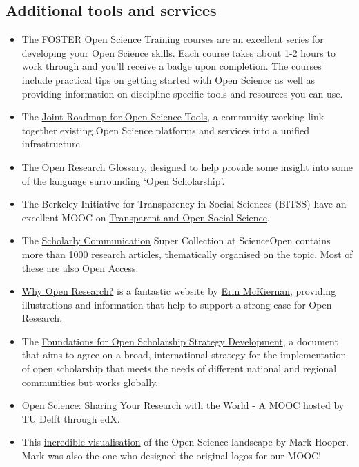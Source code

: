 \documentclass[]{book}
\begin{document}
{{{{{{\hypertarget{additional-tools-and-services}{%
\subsection{Additional tools and services}\label{additional-tools-and-services}}

\begin{itemize}
\item
  The \href{https://www.fosteropenscience.eu/toolkit}{FOSTER Open Science Training courses} are an excellent series for developing your Open Science skills. Each course takes about 1-2 hours to work through and you'll receive a badge upon completion. The courses include practical tips on getting started with Open Science as well as providing information on discipline specific tools and resources you can use.
\item
  The \href{http://jrost.org/}{Joint Roadmap for Open Science Tools}, a community working link together existing Open Science platforms and services into a unified infrastructure.
\item
  The \href{http://www.righttoresearch.org/resources/OpenResearchGlossary/index.shtml}{Open Research Glossary}, designed to help provide some insight into some of the language surrounding `Open Scholarship'.
\item
  The Berkeley Initiative for Transparency in Social Sciences (BITSS) have an excellent MOOC on \href{https://www.bitss.org/events/mooc-transparent-and-open-social-science/}{Transparent and Open Social Science}.
\item
  The \href{https://www.scienceopen.com/search\#collection/69988c7e-1855-4007-ba94-caa4c4638b1f}{Scholarly Communication} Super Collection at ScienceOpen contains more than 1000 research articles, thematically organised on the topic. Most of these are also Open Access.
\item
  \href{http://whyopenresearch.org/}{Why Open Research?} is a fantastic website by \href{https://twitter.com/emckiernan13}{Erin McKiernan}, providing illustrations and information that help to support a strong case for Open Research.
\item
  The \href{https://open-scholarship-strategy.github.io/site/}{Foundations for Open Scholarship Strategy Development}, a document that aims to agree on a broad, international strategy for the implementation of open scholarship that meets the needs of different national and regional communities but works globally.
\item
  \href{https://www.edx.org/course/open-science-sharing-your-research-with-the-world}{Open Science: Sharing Your Research with the World} - A MOOC hosted by TU Delft through edX.
\item
  This \href{http://www.markhooper.io/openscience/\#-1:0100000000}{incredible visualisation} of the Open Science landscape by Mark Hooper. Mark was also the one who designed the original logos for our MOOC!
\end{itemize}

}}}}}}
\end{document}
